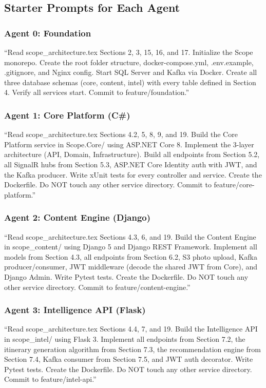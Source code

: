 \documentclass[12pt,letterpaper]{article}
\begin{document}
\subsection{Starter Prompts for Each Agent}

\subsubsection{Agent 0: Foundation}
``Read scope\_architecture.tex Sections 2, 3, 15, 16, and 17. Initialize the Scope monorepo. Create the root folder structure, docker-compose.yml, .env.example, .gitignore, and Nginx config. Start SQL Server and Kafka via Docker. Create all three database schemas (core, content, intel) with every table defined in Section 4. Verify all services start. Commit to feature/foundation.''

\subsubsection{Agent 1: Core Platform (C\#)}
``Read scope\_architecture.tex Sections 4.2, 5, 8, 9, and 19. Build the Core Platform service in Scope.Core/ using ASP.NET Core 8. Implement the 3-layer architecture (API, Domain, Infrastructure). Build all endpoints from Section 5.2, all SignalR hubs from Section 5.3, ASP.NET Core Identity auth with JWT, and the Kafka producer. Write xUnit tests for every controller and service. Create the Dockerfile. Do NOT touch any other service directory. Commit to feature/core-platform.''

\subsubsection{Agent 2: Content Engine (Django)}
``Read scope\_architecture.tex Sections 4.3, 6, and 19. Build the Content Engine in scope\_content/ using Django 5 and Django REST Framework. Implement all models from Section 4.3, all endpoints from Section 6.2, S3 photo upload, Kafka producer/consumer, JWT middleware (decode the shared JWT from Core), and Django Admin. Write Pytest tests. Create the Dockerfile. Do NOT touch any other service directory. Commit to feature/content-engine.''

\subsubsection{Agent 3: Intelligence API (Flask)}
``Read scope\_architecture.tex Sections 4.4, 7, and 19. Build the Intelligence API in scope\_intel/ using Flask 3. Implement all endpoints from Section 7.2, the itinerary generation algorithm from Section 7.3, the recommendation engine from Section 7.4, Kafka consumer from Section 7.5, and JWT auth decorator. Write Pytest tests. Create the Dockerfile. Do NOT touch any other service directory. Commit to feature/intel-api.''
\end{document}
